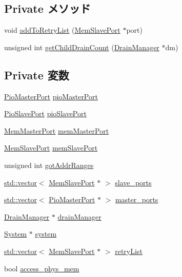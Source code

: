 \subsection*{Private メソッド}
\begin{DoxyCompactItemize}
\item 
void \hyperlink{classRubyPort_ad473637152492944180673282ebe71a3}{addToRetryList} (\hyperlink{classRubyPort_1_1MemSlavePort}{MemSlavePort} $\ast$port)
\item 
unsigned int \hyperlink{classRubyPort_a6497fe5e5b0476effb15db9118962e93}{getChildDrainCount} (\hyperlink{classDrainManager}{DrainManager} $\ast$dm)
\end{DoxyCompactItemize}
\subsection*{Private 変数}
\begin{DoxyCompactItemize}
\item 
\hyperlink{classRubyPort_1_1PioMasterPort}{PioMasterPort} \hyperlink{classRubyPort_ae1618ee13262dd22f26a87a3bcb2dca2}{pioMasterPort}
\item 
\hyperlink{classRubyPort_1_1PioSlavePort}{PioSlavePort} \hyperlink{classRubyPort_a294b27c7011440b7e24e12afddd75eab}{pioSlavePort}
\item 
\hyperlink{classRubyPort_1_1MemMasterPort}{MemMasterPort} \hyperlink{classRubyPort_ac2c1831a0923d1c83c01f7854d1d707e}{memMasterPort}
\item 
\hyperlink{classRubyPort_1_1MemSlavePort}{MemSlavePort} \hyperlink{classRubyPort_a5b8a0b35186f04ce4aeae758f4f0a698}{memSlavePort}
\item 
unsigned int \hyperlink{classRubyPort_a7194bb8c21c2c460cc31ecea9f08b1db}{gotAddrRanges}
\item 
\hyperlink{classstd_1_1vector}{std::vector}$<$ \hyperlink{classRubyPort_1_1MemSlavePort}{MemSlavePort} $\ast$ $>$ \hyperlink{classRubyPort_ac00171ae3169a04dcc3119647b11711f}{slave\_\-ports}
\item 
\hyperlink{classstd_1_1vector}{std::vector}$<$ \hyperlink{classRubyPort_1_1PioMasterPort}{PioMasterPort} $\ast$ $>$ \hyperlink{classRubyPort_ac95349e84e36b96125370f0ff8196196}{master\_\-ports}
\item 
\hyperlink{classDrainManager}{DrainManager} $\ast$ \hyperlink{classRubyPort_a329b71fb934a93312ca0aacbf5a3f982}{drainManager}
\item 
\hyperlink{classSystem}{System} $\ast$ \hyperlink{classRubyPort_af27ccd765f13a4b7bd119dc7579e2746}{system}
\item 
\hyperlink{classstd_1_1vector}{std::vector}$<$ \hyperlink{classRubyPort_1_1MemSlavePort}{MemSlavePort} $\ast$ $>$ \hyperlink{classRubyPort_a90d108bebdfeb2310e9a40b66b22f429}{retryList}
\item 
bool \hyperlink{classRubyPort_a5925f629d4ec58811bba7c4fa6b4d64d}{access\_\-phys\_\-mem}
\end{DoxyCompactItemize}


